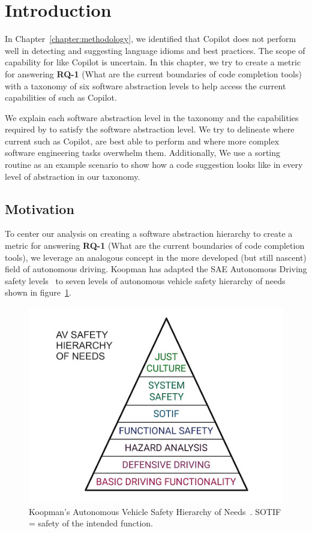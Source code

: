 \label{chapter:framework}

\section{Introduction}
In Chapter~\ref{chapter:methodology}, we identified that Copilot does not perform well in detecting and suggesting language idioms and best practices.
The scope of capability for \cct{} like Copilot is uncertain. 
In this chapter, we try to create a metric for answering \textbf{RQ-1} (What are the current boundaries of code completion tools) with a taxonomy of six software abstraction levels to help access the current capabilities of \cct{} such as Copilot. 

We explain each software abstraction level in the taxonomy and the capabilities required by \cct{} to satisfy the software abstraction level. 
We try to delineate where current \cct{} such as Copilot, are best able to perform and where more complex software engineering tasks overwhelm them. 
Additionally, We use a sorting routine as an example scenario to show how a \cct{} code suggestion looks like in every level of abstraction in our taxonomy.

\subsection{Motivation}
To center our analysis on creating a software abstraction hierarchy to create a metric for answering \textbf{RQ-1} (What are the current boundaries of code completion tools), 
we leverage an analogous concept in the more developed (but still nascent) field of autonomous driving. 
Koopman has adapted the SAE Autonomous Driving safety levels~\cite{sae} to seven levels of autonomous vehicle safety hierarchy of needs shown in figure~\ref{fig:koopman_pyramid}. 

\begin{figure}[hbt!]
    \centering
    \includegraphics[width=\linewidth]{Figures/koopman_pyramid.png}
    \caption{Koopman's Autonomous Vehicle Safety Hierarchy of Needs~\cite{koopman}. SOTIF = safety of the intended function.}
    \label{fig:koopman_pyramid}
\end{figure}

